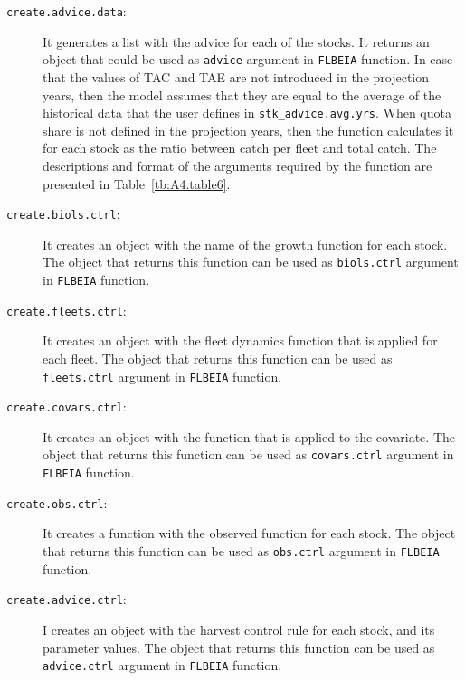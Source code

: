 \begin{description}
  \item[\texttt{create.advice.data}:] It generates a list with the advice for each of the stocks. It returns an object that could be used as \texttt{advice} argument in \texttt{FLBEIA} function. In case that the values of TAC and TAE are not introduced in the projection years, then the model assumes that they are equal to the average of the historical data that the user defines in \texttt{stk\_advice.avg.yrs}. When quota share is not defined in the projection years, then the function calculates it for each stock as the ratio between catch per fleet and total catch. The descriptions and format of the arguments required by the function are presented in Table~\ref{tb:A4.table6}.
\end{description}

\begin{description}
  \item[\texttt{create.biols.ctrl}:] It creates an object with the name of the growth function for each stock. The object that returns this function can be used as \texttt{biols.ctrl} argument in \texttt{FLBEIA} function.
\end{description}

\begin{description}
  \item[\texttt{create.fleets.ctrl}:] It creates an object with the fleet dynamics function that is applied for each fleet. The object that returns this function can be used as \texttt{fleets.ctrl} argument in \texttt{FLBEIA} function.
\end{description}

\begin{description}
  \item[\texttt{create.covars.ctrl}:] It creates an object with the function that is applied to the covariate. The object that returns this function can be used as \texttt{covars.ctrl} argument in \texttt{FLBEIA} function.
\end{description}

\begin{description}
  \item[\texttt{create.obs.ctrl}:] It creates a function with the observed function for each stock. The object that returns this function can be used as \texttt{obs.ctrl} argument in \texttt{FLBEIA} function.
\end{description}

\begin{description}
  \item[\texttt{create.advice.ctrl}:] I creates an object with the harvest control rule for each stock, and its parameter values. The object that returns this function can be used as \texttt{advice.ctrl} argument in \texttt{FLBEIA} function.
\end{description}

